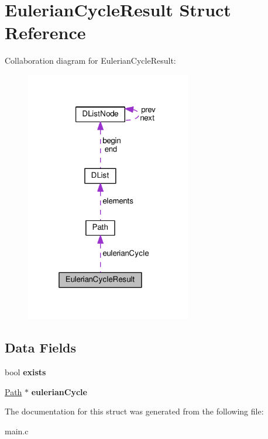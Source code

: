\hypertarget{struct_eulerian_cycle_result}{}\section{Eulerian\+Cycle\+Result Struct Reference}
\label{struct_eulerian_cycle_result}


Collaboration diagram for Eulerian\+Cycle\+Result\+:
\nopagebreak
\begin{figure}[H]
\begin{center}
\leavevmode
\includegraphics[width=205pt]{struct_eulerian_cycle_result__coll__graph}
\end{center}
\end{figure}
\subsection*{Data Fields}
\begin{DoxyCompactItemize}
\item 
bool {\bfseries exists}\hypertarget{struct_eulerian_cycle_result_a6e480061dc5ecc1f85a71989a6352dfc}{}\label{struct_eulerian_cycle_result_a6e480061dc5ecc1f85a71989a6352dfc}

\item 
\hyperlink{struct_path}{Path} $\ast$ {\bfseries eulerian\+Cycle}\hypertarget{struct_eulerian_cycle_result_a28be178a08599785a2a8b3df775b48f8}{}\label{struct_eulerian_cycle_result_a28be178a08599785a2a8b3df775b48f8}

\end{DoxyCompactItemize}


The documentation for this struct was generated from the following file\+:\begin{DoxyCompactItemize}
\item 
main.\+c\end{DoxyCompactItemize}
